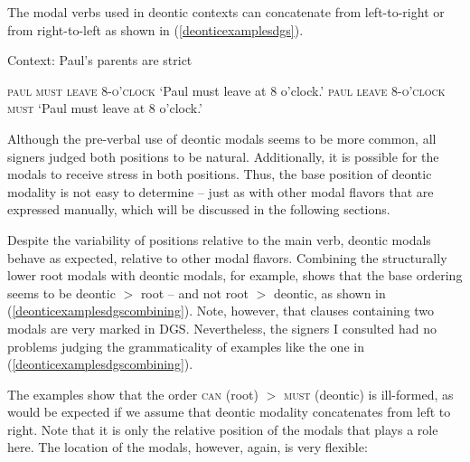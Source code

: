The modal verbs used in deontic contexts can concatenate from left-to-right or from right-to-left as shown in (\ref{deonticexamplesdgs}). 

\begin{exe}
\ex Context: Paul's parents are strict\label{deonticexamplesdgs}\begin{xlist}
\ex \textsc{paul must leave 8-o'clock}
\glt `Paul must leave at 8 o'clock.'\label{deonticexamplesdgsa}
\ex \textsc{paul leave 8-o'clock must}
\glt `Paul must leave at 8 o'clock.'\label{deonticexamplesdgsb}
\end{xlist}
\end{exe}

\noindent Although the pre-verbal use of deontic modals seems to be more common, all signers judged both positions to be natural. Additionally, it is possible for the modals to receive stress in both positions. Thus, the base position of deontic modality is not easy to determine -- just as with other modal flavors that are expressed manually, which will be discussed in the following sections.

Despite the variability of positions relative to the main verb, deontic modals behave as expected, relative to other modal flavors. Combining the structurally lower root modals with deontic modals, for example, shows that the base ordering seems to be deontic $>$ root -- and not root $>$ deontic, as shown in (\ref{deonticexamplesdgscombining}). Note, however, that clauses containing two modals are very marked in DGS. Nevertheless, the signers I consulted had no problems judging the grammaticality of examples like the one in (\ref{deonticexamplesdgscombining}).

\begin{exe}
\ex\label{deonticexamplesdgscombining}\begin{xlist}
\end{xlist}
\end{exe}

\noindent The examples show that the order \textsc{can} (root) $>$ \textsc{must} (deontic) is ill-formed, as would be expected if we assume that deontic modality concatenates from left to right. Note that it is only the relative position of the modals that plays a role here. The location of the modals, however, again, is very flexible:

